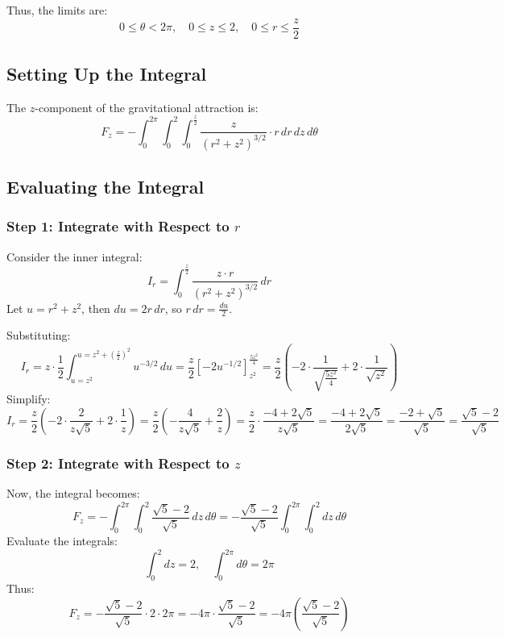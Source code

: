 \documentclass[11pt]{article}
\begin{document}
Thus, the limits are:
\[
0 \leq \theta < 2\pi, \quad 0 \leq z \leq 2, \quad 0 \leq r \leq \frac{z}{2}
\]

\newpage

\subsection{Setting Up the Integral}

The \( z \)-component of the gravitational attraction is:
\[
F_z = - \int_{0}^{2\pi} \int_{0}^{2} \int_{0}^{\frac{z}{2}} \frac{z}{(r^2 + z^2)^{3/2}} \cdot r \, dr \, dz \, d\theta
\]

\newpage

\subsection{Evaluating the Integral}

\subsubsection*{Step 1: Integrate with Respect to \( r \)}
Consider the inner integral:
\[
I_r = \int_{0}^{\frac{z}{2}} \frac{z \cdot r}{(r^2 + z^2)^{3/2}} \, dr
\]
Let \( u = r^2 + z^2 \), then \( du = 2r \, dr \), so \( r \, dr = \frac{du}{2} \).

Substituting:
\[
I_r = z \cdot \frac{1}{2} \int_{u = z^2}^{u = z^2 + \left(\frac{z}{2}\right)^2} u^{-3/2} \, du = \frac{z}{2} \left[ -2u^{-1/2} \right]_{z^2}^{\frac{5z^2}{4}} = \frac{z}{2} \left( -2 \cdot \frac{1}{\sqrt{\frac{5z^2}{4}}} + 2 \cdot \frac{1}{\sqrt{z^2}} \right )
\]
Simplify:
\[
I_r = \frac{z}{2} \left( -2 \cdot \frac{2}{z\sqrt{5}} + 2 \cdot \frac{1}{z} \right ) = \frac{z}{2} \left( -\frac{4}{z\sqrt{5}} + \frac{2}{z} \right ) = \frac{z}{2} \cdot \frac{-4 + 2\sqrt{5}}{z\sqrt{5}} = \frac{-4 + 2\sqrt{5}}{2\sqrt{5}} = \frac{-2 + \sqrt{5}}{\sqrt{5}} = \frac{\sqrt{5} - 2}{\sqrt{5}}
\]

\subsubsection*{Step 2: Integrate with Respect to \( z \)}
Now, the integral becomes:
\[
F_z = - \int_{0}^{2\pi} \int_{0}^{2} \frac{\sqrt{5} - 2}{\sqrt{5}} \, dz \, d\theta = - \frac{\sqrt{5} - 2}{\sqrt{5}} \int_{0}^{2\pi} \int_{0}^{2} dz \, d\theta
\]
Evaluate the integrals:
\[
\int_{0}^{2} dz = 2, \quad \int_{0}^{2\pi} d\theta = 2\pi
\]
Thus:
\[
F_z = - \frac{\sqrt{5} - 2}{\sqrt{5}} \cdot 2 \cdot 2\pi = -4\pi \cdot \frac{\sqrt{5} - 2}{\sqrt{5}} = -4\pi \left( \frac{\sqrt{5} - 2}{\sqrt{5}} \right )
\]
\end{document}
